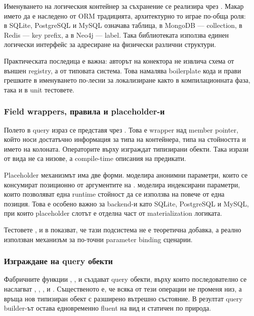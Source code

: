 Именуването на логическия контейнер за съхранение се реализира чрез . Макар името да е наследено от ORM традицията, архитектурно то играе по-обща роля: в SQLite, PostgreSQL и MySQL означава таблица, в MongoDB --- collection, в Redis --- key prefix, а в Neo4j --- label. Така библиотеката използва единен логически интерфейс за адресиране на физически различни структури.

Практическата последица е важна: авторът на конектора не извлича схема от външен registry, а от типовата система. Това намалява boilerplate кода и прави грешките в именуването по-лесни за локализиране както в компилационната фаза, така и в unit тестовете.

\subsubsection{Field wrappers, правила и placeholder-и}

Полето в query израз се представя чрез . Това е  wrapper над member pointer, който носи достатъчно информация за типа на контейнера, типа на стойността и името на колоната. Операторите върху  изграждат типизирани  обекти. Така изрази от вида  не са низове, а compile-time описания на предикати.

Placeholder механизмът има две форми.  моделира анонимни параметри, които се консумират позиционно от аргументите на .  моделира индексирани параметри, които позволяват една runtime стойност да се използва на повече от една позиция. Това е особено важно за backend-и като SQLite, PostgreSQL и MySQL, при които placeholder слотът е отделна част от materialization логиката.

Тестовете ,  и  в  показват, че тази подсистема не е теоретична добавка, а реално използван механизъм за по-точни parameter binding сценарии.

\subsubsection{Изграждане на query обекти}

Фабричните функции , ,  и  създават query обекти, върху които последователно се наслагват , , ,  и . Същественото е, че всяка от тези операции не променя низ, а връща нов типизиран обект с разширено вътрешно състояние. В резултат query builder-ът остава едновременно fluent на вид и статичен по природа.

